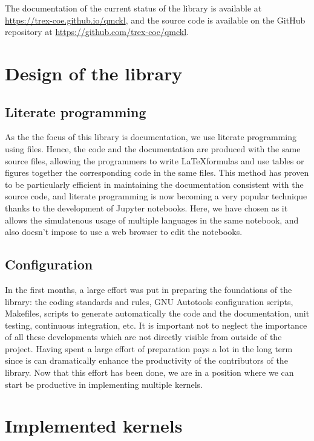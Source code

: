 The documentation of the current status of the library is available
at \url{https://trex-coe.github.io/qmckl}, and the source code is
available on the GitHub repository at \url{https://github.com/trex-coe/qmckl}.

\section{Design of the library}

\subsection{Literate programming}

As the the focus of this library is documentation, we use literate
programming using {\orgmode} files.\cite{schulte_2012,orgmode}
Hence, the code and the documentation are produced with the same
source files, allowing the programmers to write \LaTeX formulas and
use tables or figures together the corresponding code in the same
files.
This method has proven to be particularly efficient in maintaining the
documentation consistent with the source code, and literate
programming is now becoming a very popular technique thanks to the
development of Jupyter notebooks.
Here, we have chosen {\orgmode} as it allows the simulatenous usage of
multiple languages in the same notebook, and also doesn't impose to
use a web browser to edit the notebooks.

\subsection{Configuration}

In the first months, a large effort was put in preparing the
foundations of the library: the coding standards and rules, GNU Autotools
configuration scripts, Makefiles, scripts to generate automatically
the code and the documentation, unit testing, continuous integration,
etc. It is important not to neglect the importance of all these
developments which are not directly visible from outside of the project.
Having spent a large effort of preparation pays a lot in the long term
since is can dramatically enhance the productivity of the contributors
of the library.
Now that this effort has been done, we are in a position where we can
start be productive in implementing multiple kernels.

\section{Implemented kernels}

